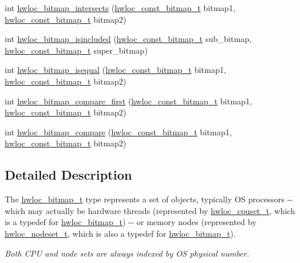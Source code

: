 \begin{DoxyCompactItemize}
$$\item 
 int \hyperlink{a00065_ga575c27953709a8cb9a047aae65157526}{hwloc\_\-bitmap\_\-intersects} (\hyperlink{a00065_ga2fb1bbc8aea1ea22dee2f0fd39659f48}{hwloc\_\-const\_\-bitmap\_\-t} bitmap1, \hyperlink{a00065_ga2fb1bbc8aea1ea22dee2f0fd39659f48}{hwloc\_\-const\_\-bitmap\_\-t} bitmap2) 
\item 
 int \hyperlink{a00065_gaae29e14a926c198e8f91e6e4790621e7}{hwloc\_\-bitmap\_\-isincluded} (\hyperlink{a00065_ga2fb1bbc8aea1ea22dee2f0fd39659f48}{hwloc\_\-const\_\-bitmap\_\-t} sub\_\-bitmap, \hyperlink{a00065_ga2fb1bbc8aea1ea22dee2f0fd39659f48}{hwloc\_\-const\_\-bitmap\_\-t} super\_\-bitmap) 
\item 
 int \hyperlink{a00065_ga4dd6a75ab63d33ef33bd626b0e489388}{hwloc\_\-bitmap\_\-isequal} (\hyperlink{a00065_ga2fb1bbc8aea1ea22dee2f0fd39659f48}{hwloc\_\-const\_\-bitmap\_\-t} bitmap1, \hyperlink{a00065_ga2fb1bbc8aea1ea22dee2f0fd39659f48}{hwloc\_\-const\_\-bitmap\_\-t} bitmap2) 
\item 
 int \hyperlink{a00065_gac1cbd1e03f9986552243761e657e1752}{hwloc\_\-bitmap\_\-compare\_\-first} (\hyperlink{a00065_ga2fb1bbc8aea1ea22dee2f0fd39659f48}{hwloc\_\-const\_\-bitmap\_\-t} bitmap1, \hyperlink{a00065_ga2fb1bbc8aea1ea22dee2f0fd39659f48}{hwloc\_\-const\_\-bitmap\_\-t} bitmap2) 
\item 
 int \hyperlink{a00065_gadd3aa325f2d6a17b5aa3b3be9c740da0}{hwloc\_\-bitmap\_\-compare} (\hyperlink{a00065_ga2fb1bbc8aea1ea22dee2f0fd39659f48}{hwloc\_\-const\_\-bitmap\_\-t} bitmap1, \hyperlink{a00065_ga2fb1bbc8aea1ea22dee2f0fd39659f48}{hwloc\_\-const\_\-bitmap\_\-t} bitmap2) 
\end{DoxyCompactItemize}


\subsection{Detailed Description}
The \hyperlink{a00065_gaa3c2bf4c776d603dcebbb61b0c923d84}{hwloc\_\-bitmap\_\-t} type represents a set of objects, typically OS processors -\/-\/ which may actually be hardware threads (represented by \hyperlink{a00040_ga4bbf39b68b6f568fb92739e7c0ea7801}{hwloc\_\-cpuset\_\-t}, which is a typedef for \hyperlink{a00065_gaa3c2bf4c776d603dcebbb61b0c923d84}{hwloc\_\-bitmap\_\-t}) -\/-\/ or memory nodes (represented by \hyperlink{a00040_ga37e35730fa7e775b5bb0afe893d6d508}{hwloc\_\-nodeset\_\-t}, which is also a typedef for \hyperlink{a00065_gaa3c2bf4c776d603dcebbb61b0c923d84}{hwloc\_\-bitmap\_\-t}).

{\itshape Both CPU and node sets are always indexed by OS physical number.\/}

